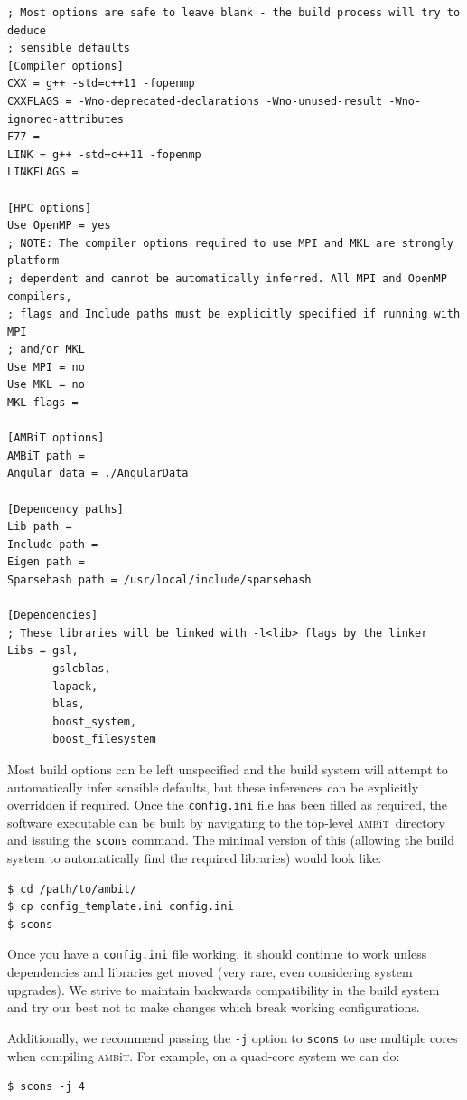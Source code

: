 \documentclass{report}
\newcommand{\ambit}{\textsc{amb}{\footnotesize i}\textsc{t}}
\begin{document}
\begin{verbatim}
; Most options are safe to leave blank - the build process will try to deduce
; sensible defaults
[Compiler options]
CXX = g++ -std=c++11 -fopenmp
CXXFLAGS = -Wno-deprecated-declarations -Wno-unused-result -Wno-ignored-attributes 
F77 = 
LINK = g++ -std=c++11 -fopenmp
LINKFLAGS = 

[HPC options]
Use OpenMP = yes
; NOTE: The compiler options required to use MPI and MKL are strongly platform 
; dependent and cannot be automatically inferred. All MPI and OpenMP compilers, 
; flags and Include paths must be explicitly specified if running with MPI 
; and/or MKL
Use MPI = no
Use MKL = no
MKL flags = 

[AMBiT options]
AMBiT path = 
Angular data = ./AngularData

[Dependency paths]
Lib path =
Include path =
Eigen path =
Sparsehash path = /usr/local/include/sparsehash

[Dependencies]
; These libraries will be linked with -l<lib> flags by the linker
Libs = gsl,
       gslcblas,
       lapack, 
       blas, 
       boost_system, 
       boost_filesystem
\end{verbatim}

Most build options can be left unspecified and the build system will attempt to automatically
infer sensible defaults, but these inferences can be explicitly overridden if required. Once the 
\texttt{config.ini} file has been filled as required, the software executable can be built by 
navigating to the top-level \ambit\  directory and issuing the \texttt{scons} command. The minimal
version of this (allowing the build system to automatically find the required libraries) would look
like:

\begin{verbatim}
$ cd /path/to/ambit/
$ cp config_template.ini config.ini
$ scons
\end{verbatim}

Once you have a \texttt{config.ini} file working, it should continue to work unless dependencies and
libraries get moved (very rare, even considering system upgrades). We strive to maintain backwards
compatibility in the build system and try our best not to make changes which break working 
configurations. 

Additionally, we recommend passing the \texttt{-j} option to \texttt{scons} to use multiple cores when
compiling \ambit. For example, on a quad-core system we can do:

\begin{verbatim}
$ scons -j 4
\end{verbatim}
\end{document}
